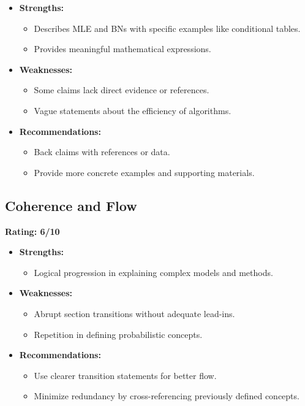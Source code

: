 \documentclass{article}
\begin{document}
\begin{itemize}
    \item \textbf{Strengths:}
    \begin{itemize}
        \item Describes MLE and BNs with specific examples like conditional tables.
        \item Provides meaningful mathematical expressions.
    \end{itemize}
    \item \textbf{Weaknesses:}
    \begin{itemize}
        \item Some claims lack direct evidence or references.
        \item Vague statements about the efficiency of algorithms.
    \end{itemize}
    \item \textbf{Recommendations:}
    \begin{itemize}
        \item Back claims with references or data.
        \item Provide more concrete examples and supporting materials.
    \end{itemize}
\end{itemize}

\subsection{Coherence and Flow}
\textbf{Rating: 6/10}

\begin{itemize}
    \item \textbf{Strengths:}
    \begin{itemize}
        \item Logical progression in explaining complex models and methods.
    \end{itemize}
    \item \textbf{Weaknesses:}
    \begin{itemize}
        \item Abrupt section transitions without adequate lead-ins.
        \item Repetition in defining probabilistic concepts.
    \end{itemize}
    \item \textbf{Recommendations:}
    \begin{itemize}
        \item Use clearer transition statements for better flow.
        \item Minimize redundancy by cross-referencing previously defined concepts.
    \end{itemize}
\end{itemize}
\end{document}

